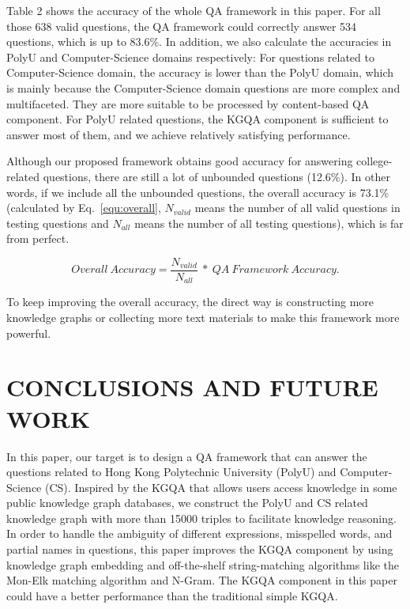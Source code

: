 \documentclass[11pt]{article}
\begin{document}
Table 2 shows the accuracy of the whole QA framework in this paper. For all those 638 valid questions, the QA framework could correctly answer 534 questions, which is up to 83.6\%. In addition, we also calculate the accuracies in PolyU and Computer-Science domains respectively: For questions related to Computer-Science domain, the accuracy is lower than the PolyU domain, which is mainly because the Computer-Science domain questions are more complex and multifaceted. They are more suitable to be processed by content-based QA component. For PolyU related questions, the KGQA component is sufficient to answer most of them, and we achieve relatively satisfying performance.

Although our proposed framework obtains good accuracy for answering college-related questions, there are still a lot of unbounded questions (12.6\%). In other words, if we include all the unbounded questions, the overall accuracy is 73.1\% (calculated by Eq.~\eqref{equ:overall}, $N_{valid}$ means the number of all valid questions in testing questions and $N_{all}$ means the number of all testing questions), which is far from perfect.

\begin{equation}
    Overall \ Accuracy= \frac{N_{valid}}{N_{all}} \ * \ {QA \ Framework \ Accuracy} .
    \label{equ:overall}
\end{equation}

To keep improving the overall accuracy, the direct way is constructing more knowledge graphs or collecting more text materials to make this framework more powerful.






\section{CONCLUSIONS AND FUTURE WORK}
In this paper, our target is to design a QA framework that can answer the questions related to Hong Kong Polytechnic University (PolyU) and Computer-Science (CS). Inspired by the KGQA that allows users access knowledge in some public knowledge graph databases, we construct the PolyU and CS related knowledge graph with more than 15000 triples to facilitate knowledge reasoning. In order to handle the ambiguity of different expressions, misspelled words, and partial names in questions, this paper improves the KGQA component by using knowledge graph embedding and off-the-shelf string-matching algorithms like the Mon-Elk matching algorithm and N-Gram. The KGQA component in this paper could have a better performance than the traditional simple KGQA.
\end{document}
